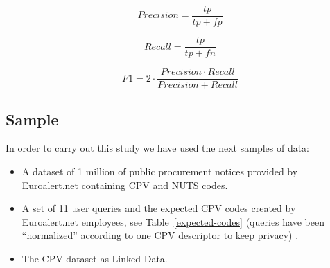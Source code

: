 % 
% 


\begin{figure}[ht]
\begin{minipage}[b]{0.45\linewidth}
\centering
\begin{equation}\label{eq-1}
Precision = \frac{tp}{tp+fp} 
\end{equation}
\end{minipage}
\hspace{0.5cm}
\begin{minipage}[b]{0.45\linewidth}
\centering
\begin{equation}\label{eq-2}
Recall = \frac{tp}{tp+fn}
\end{equation}
\end{minipage}
\end{figure}


\begin{equation}\label{eq-3}
F1 = 2 \cdot \frac{Precision \cdot Recall}{ Precision + Recall}
\end{equation}




\subsection{Sample}
In order to carry out this study we have used the next samples of data:
\begin{itemize}
\item A dataset of 1 million of public procurement notices provided by Euroalert.net containing CPV and NUTS codes.
\item A set of 11 user queries and the expected CPV codes created by Euroalert.net employees, see Table~\ref{expected-codes} (queries have been ``normalized'' according to one CPV descriptor to keep privacy) .
\item The CPV dataset as Linked Data.
\end{itemize}



